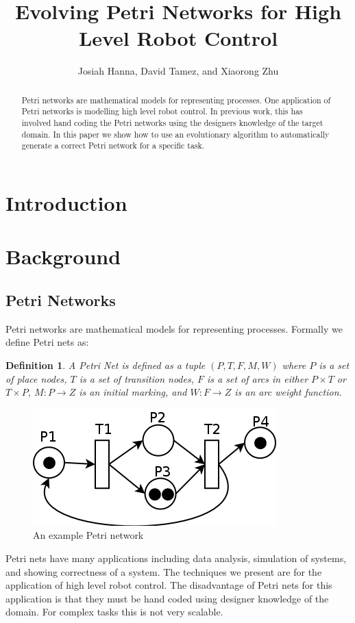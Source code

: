 \documentclass[12pt,a4paper,twocolumn]{article}
\author{Josiah Hanna, David Tamez, and Xiaorong Zhu}
\title{Evolving Petri Networks for High Level Robot Control}
\newtheorem{myDef}{Definition}
\begin{document}
\maketitle

\begin{abstract}

Petri networks are mathematical models for representing processes. One application of Petri networks is modelling high level robot control. In previous work, this has involved hand coding the Petri networks using the designers knowledge of the target domain. In this paper we show how to use an evolutionary algorithm to automatically generate a correct Petri network for a specific task. 

\end{abstract}

\section{Introduction}

\section{Background}

\subsection{Petri Networks}
Petri networks are mathematical models for representing processes. Formally we define Petri nets as:
\begin{myDef}
A Petri Net is defined as a tuple $(P,T,F,M,W)$ where $P$ is a set of place nodes, $T$ is a set of transition nodes, $F$ is a set of arcs in either $P \times T$ or $T \times P$, $M: P \rightarrow Z$ is an initial marking, and $W: F \rightarrow Z$ is an arc weight function.
\end{myDef}
\begin{figure}[h]
\centering
\includegraphics[scale=0.25]{petri_net.png}
\caption[]{An example Petri network \label{exampleNet}}
\end{figure}
Petri nets have many applications including data analysis, simulation of systems, and showing correctness of a system. The techniques we present are for the application of high level robot control. The disadvantage of Petri nets for this application is that they must be hand coded using designer knowledge of the domain. For complex tasks this is not very scalable.
\end{document}
